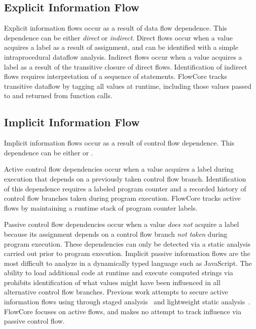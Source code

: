 \subsection{Explicit Information Flow}
Explicit information flows occur as a result of data flow dependence.
This dependence can be either \emph{direct} or \emph{indirect}.
Direct flows occur when a value acquires a label as a result of assignment, and can be identified with a simple intraprocedural dataflow analysis.
Indirect flows occur when a value acquires a label as a result of the transitive closure of direct flows.
Identification of indirect flows requires interpretation of a sequence of statements.
FlowCore tracks transitive dataflow by tagging all values at runtime, including those values passed to and returned from function calls.

\subsection{Implicit Information Flow}
Implicit information flows occur as a result of control flow dependence.
This dependence can be either  or .

Active control flow dependencies occur when a value acquires a label during execution that depends on a previously taken control flow branch.
Identification of this dependence requires a labeled program counter and a recorded history of control flow branches taken during program execution.
FlowCore tracks active flows by maintaining a runtime stack of program counter labels.

Passive control flow dependencies occur when a value \emph{does not} acquire a label because its assignment depends on a control flow branch \emph{not taken} during program execution.
These dependencies can only be detected via a static analysis carried out prior to program execution.
Implicit passive information flows are the most difficult to analyze in a dynamically typed language such as JavaScript.
The ability to load additional code at runtime and execute computed strings via  prohibits identification of what values might have been influenced in all alternative control flow branches.
Previous work attempts to secure active information flows using through staged analysis~\cite{staged-javascript} and lightweight static analysis~\cite{XSS-tainting}.
FlowCore focuses on active flows, and makes no attempt to track influence via passive control flow.

